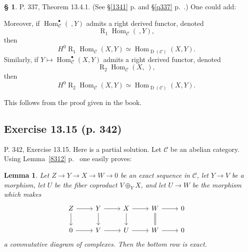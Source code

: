 \documentclass[12pt]{article}%
\newtheorem{lem}[thm]{Lemma}
\theoremstyle{remark}
\theoremstyle{definition}
\newtheorem{s}[thm]{\S}%
\newcommand{\bu}{\bullet}
\newcommand{\oo}{\operatorname}
\newcommand{\C}{\mathcal C}
\DeclareMathOperator{\Hom}{Hom}%
\begin{document}
%

\begin{s}%
P. 337, Theorem 13.4.1. (See \S\ref{1341} p. \pageref{1341} and \S\ref{q337} p.~\pageref{q337}.) One could add:

Moreover, if $\Hom_\C^\bu(\ ,Y)$ admits a right derived functor, denoted 
$$
\oo R_1\!\Hom_\C(\ ,Y),
$$ 
then 
$$
H^0\oo R_1\!\Hom_\C(X,Y)\simeq\Hom_{\oo D(\C)}(X,Y).
$$ 
Similarly, if $Y\mapsto\Hom_\C^\bu(X,Y)$ admits a right derived functor, denoted 
$$
\oo R_2\!\Hom_\C(X,\ ),
$$ 
then 
$$
H^0\oo R_2\!\Hom_\C(X,Y)\simeq\Hom_{\oo D(\C)}(X,Y).
$$

This follows from the proof given in the book. 
\end{s}


\subsection{Exercise 13.15 (p. 342)}

P. 342, Exercise 13.15. Here is a partial solution. Let $\C$ be an abelian category. Using Lemma~\ref{8312} p.~\pageref{8312} one easily proves:

\begin{lem}\label{738}
Let $Z\to Y\to X\to W\to0$ be an exact sequence in $\C$, let $Y\to V$ be a morphism, let $U$ be the fiber coproduct $V\oplus_YX$, and let $U\to W$ be the morphism which makes 
$$
\begin{tikzcd}
Z\ar{d}\ar{r}&Y\ar{d}\ar{r}&X\ar{d}\ar{r}&W\ar[equal]{d}\ar{r}&0\\ 
0\ar{r}&V\ar{r}&U\ar{r}&W\ar{r}&0
\end{tikzcd}
$$ 
a commutative diagram of complexes. Then the bottom row is exact.
\end{lem}
\end{document}
